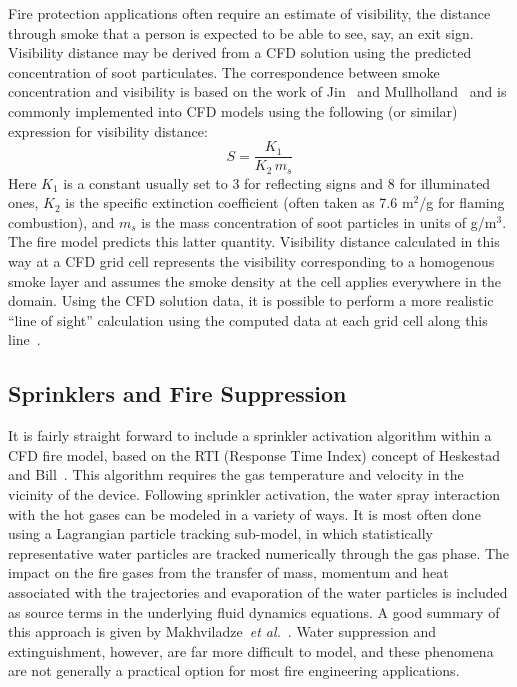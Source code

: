 \documentclass[graybox]{svmult}
\begin{document}
Fire protection applications often require an estimate of visibility, the distance through smoke that a person is expected to be able to see, say, an exit sign. Visibility distance may be derived from a CFD solution using the predicted concentration of soot particulates. The correspondence between smoke concentration and visibility is based on the work of Jin~\cite{Jin} and Mullholland~\cite{Mulholland} and is commonly implemented into CFD models using the following (or similar) expression for visibility distance:
\begin{equation}
S = \frac{K_1}{K_2 \, m_s}
\label{eq:vis}
\end{equation}
Here $K_1$ is a constant usually set to 3 for reflecting signs and 8 for illuminated ones, $K_2$ is the specific extinction coefficient (often taken as 7.6 m$^2$/g for flaming combustion), and $m_s$ is the mass concentration of soot particles in units of g/m$^3$.  The fire model predicts this latter quantity. Visibility distance calculated in this way at a CFD grid cell represents the visibility corresponding to a homogenous smoke layer and assumes the smoke density at the cell applies everywhere in the domain. Using the CFD solution data, it is possible to perform a more realistic ``line of sight'' calculation using the computed data at each grid cell along this line~\cite{Husted}.


\subsection{Sprinklers and Fire Suppression}

It is fairly straight forward to include a sprinkler activation algorithm within a CFD fire model, based on the RTI (Response Time Index) concept of Heskestad and Bill~\cite{Heskestad:1988}. This algorithm requires the gas temperature and velocity in the vicinity of the device. Following sprinkler activation, the water spray interaction with the hot gases can be modeled in a variety of ways. It is most often done using a Lagrangian particle tracking sub-model, in which statistically representative water particles are tracked numerically through the gas phase. The impact on the fire gases from the transfer of mass, momentum and heat associated with the trajectories and evaporation of the water particles is included as source terms in the underlying fluid dynamics equations. A good summary of this approach is given by Makhviladze~{\em et al.}~\cite{Makhviladze}. Water suppression and extinguishment, however, are far more difficult to model, and these phenomena are not generally a practical option for most fire engineering applications.
\end{document}
